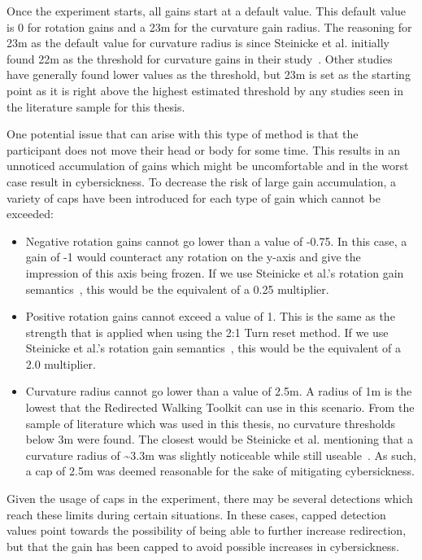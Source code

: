 Once the experiment starts, all gains start at a default value. This default value is 0 for rotation gains and a 23m for the curvature gain radius. The reasoning for 23m as the default value for curvature radius is since Steinicke et al. initially found 22m as the threshold for curvature gains in their study~\cite{5072212}. Other studies have generally found lower values as the threshold, but 23m is set as the starting point as it is right above the highest estimated threshold by any studies seen in the literature sample for this thesis.

One potential issue that can arise with this type of method is that the participant does not move their head or body for some time. This results in an unnoticed accumulation of gains which might be uncomfortable and in the worst case result in cybersickness. To decrease the risk of large gain accumulation, a variety of caps have been introduced for each type of gain which cannot be exceeded:
\begin{itemize}
    \item Negative rotation gains cannot go lower than a value of -0.75. In this case, a gain of -1 would counteract any rotation on the y-axis and give the impression of this axis being frozen. If we use Steinicke et al.'s rotation gain semantics~\cite{5072212}, this would be the equivalent of a 0.25 multiplier. 
    \item Positive rotation gains cannot exceed a value of 1. This is the same as the strength that is applied when using the 2:1 Turn reset method. If we use Steinicke et al.'s rotation gain semantics~\cite{5072212}, this would be the equivalent of a 2.0 multiplier. 
    \item Curvature radius cannot go lower than a value of 2.5m. A radius of 1m is the lowest that the Redirected Walking Toolkit can use in this scenario. From the sample of literature which was used in this thesis, no curvature thresholds below 3m were found. The closest would be Steinicke et al. mentioning that a curvature radius of \textasciitilde3.3m was slightly noticeable while still useable~\cite{5072212}. As such, a cap of 2.5m was deemed reasonable for the sake of mitigating cybersickness. 
\end{itemize}


Given the usage of caps in the experiment, there may be several detections which reach these limits during certain situations. In these cases, capped detection values point towards the possibility of being able to further increase redirection, but that the gain has been capped to avoid possible increases in cybersickness.
   
